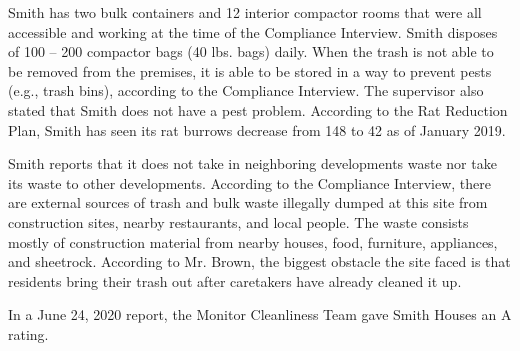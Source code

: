 Smith has two bulk containers and 12 interior compactor rooms that were all accessible and working at the time of the Compliance Interview. Smith disposes of 100 -- 200 compactor bags (40 lbs. bags) daily. When the trash is not able to be removed from the premises, it is able to be stored in a way to prevent pests (e.g., trash bins), according to the Compliance Interview. The supervisor also stated that Smith does not have a pest problem. According to the Rat Reduction Plan, Smith has seen its rat burrows decrease from 148 to 42 as of January 2019.

Smith reports that it does not take in neighboring developments waste nor take its waste to other developments. According to the Compliance Interview, there are external sources of trash and bulk waste illegally dumped at this site from construction sites, nearby restaurants, and local people. The waste consists mostly of construction material from nearby houses, food, furniture, appliances, and sheetrock. According to Mr. Brown, the biggest obstacle the site faced is that residents bring their trash out after caretakers have already cleaned it up. 

 

In a June 24, 2020 report, the Monitor Cleanliness Team gave Smith Houses an A rating.  

 